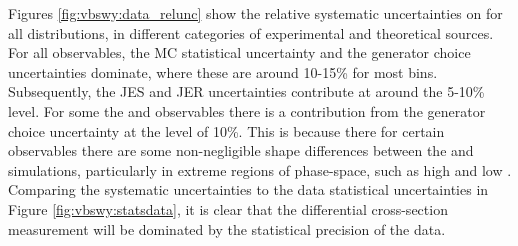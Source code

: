 Figures \ref{fig:vbswy:data_relunc} show the relative systematic uncertainties on \new for all distributions, in different categories of experimental and theoretical sources. For all observables, the MC statistical uncertainty and the \qcdwy generator choice uncertainties dominate, where these are around 10-15\% for most bins. Subsequently, the JES and JER uncertainties contribute at around the 5-10\% level. For some the \ptjj and \lepgamdphi observables there is a contribution from the \ewwy generator choice uncertainty at the level of 10\%. This is because there for certain observables there are some non-negligible shape differences between the \MADGRAPH and \SHERPA \ewwy simulations, particularly in extreme regions of phase-space, such as high \ptjj and low \lepgamdphi. Comparing the systematic uncertainties to the data statistical uncertainties in Figure \ref{fig:vbswy:statsdata}, it is clear that the differential cross-section measurement will be dominated by the statistical precision of the data.


